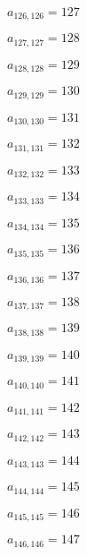 \documentclass[a4paper,12pt]{article}
\begin{document}
$a _{ 126, 126 } = 127$

$a _{ 127, 127 } = 128$

$a _{ 128, 128 } = 129$

$a _{ 129, 129 } = 130$

$a _{ 130, 130 } = 131$

$a _{ 131, 131 } = 132$

$a _{ 132, 132 } = 133$

$a _{ 133, 133 } = 134$

$a _{ 134, 134 } = 135$

$a _{ 135, 135 } = 136$

$a _{ 136, 136 } = 137$

$a _{ 137, 137 } = 138$

$a _{ 138, 138 } = 139$

$a _{ 139, 139 } = 140$

$a _{ 140, 140 } = 141$

$a _{ 141, 141 } = 142$

$a _{ 142, 142 } = 143$

$a _{ 143, 143 } = 144$

$a _{ 144, 144 } = 145$

$a _{ 145, 145 } = 146$

$a _{ 146, 146 } = 147$
\end{document}
